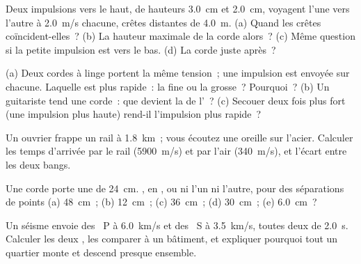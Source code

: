 \begin{exercise}[$\star\star$]\label{exo:g12:mechanical-waves:7}
Deux impulsions vers le haut, de hauteurs \qty{3.0}{cm} et
\qty{2.0}{cm}, voyagent l'une vers l'autre à \qty{2.0}{m/s} chacune,
crêtes distantes de \qty{4.0}{m}.
(a) Quand les crêtes coïncident-elles~? (b) La hauteur maximale de la
corde alors~? (c) Même question si la petite impulsion est vers le bas.
(d) La corde juste après~?
\end{exercise}

\begin{exercise}[$\star\star$]\label{exo:g12:mechanical-waves:8}
(a) Deux cordes à linge portent la même tension~; une impulsion
est envoyée sur chacune. Laquelle est plus rapide~: la
fine ou la grosse~? Pourquoi~? (b) Un guitariste tend une
corde~: que devient la  de l'~? (c) Secouer deux fois
plus fort (une impulsion plus haute) rend-il l'impulsion plus rapide~?
\end{exercise}

\begin{exercise}[$\star\star$]\label{exo:g12:mechanical-waves:9}
Un ouvrier frappe un rail à \qty{1.8}{km}~; vous écoutez une oreille
sur l'acier. Calculer les temps d'arrivée par le rail (\qty{5900}{m/s})
et par l'air (\qty{340}{m/s}), et l'écart entre les deux bangs.
\end{exercise}

\begin{exercise}[$\star\star$]\label{exo:g12:mechanical-waves:10}
Une corde porte une  de 
\qty{24}{cm}. , en ,
ou ni l'un ni l'autre, pour des séparations de points (a) \qty{48}{cm}~;
(b) \qty{12}{cm}~; (c) \qty{36}{cm}~; (d) \qty{30}{cm}~; (e)
\qty{6.0}{cm}~?
\end{exercise}

\begin{exercise}[$\star\star$]\label{exo:g12:mechanical-waves:11}
Un séisme envoie des ~P à \qty{6.0}{km/s} et des ~S à
\qty{3.5}{km/s}, toutes deux de  \qty{2.0}{s}. Calculer les
deux , les comparer à un bâtiment, et expliquer
pourquoi tout un quartier monte et descend presque ensemble.
\end{exercise}

